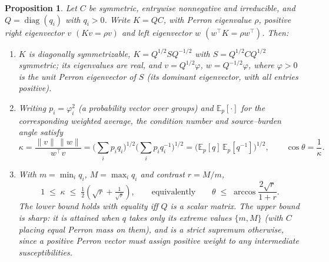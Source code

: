 \documentclass[10pt,a4paper]{amsart}
\newtheorem{proposition}{Proposition}
\begin{document}
\begin{proposition}\label{prop:kant}
Let $C$ be symmetric, entrywise nonnegative and irreducible, and $Q=\operatorname{diag}(q_i)$ with $q_i>0$. Write $K=QC$, with Perron eigenvalue $\rho$, positive right eigenvector $v$ $(Kv=\rho v)$ and left eigenvector $w$ $(w^{\top}K=\rho w^{\top})$. Then:
\begin{enumerate}
\item[\textup{(i)}] $K$ is diagonally symmetrizable, $K=Q^{1/2}SQ^{-1/2}$ with $S=Q^{1/2}CQ^{1/2}$ symmetric; its eigenvalues are real, and $v=Q^{1/2}\varphi$, $w=Q^{-1/2}\varphi$, where $\varphi>0$ is the unit Perron eigenvector of $S$ (its dominant eigenvector, with all entries positive).
\item[\textup{(ii)}] Writing $p_i=\varphi_i^{2}$ \textup{(}a probability vector over groups\textup{)} and $\mathbb{E}_p[\cdot]$ for the corresponding weighted average, the condition number and source--burden angle satisfy
\begin{equation}
\kappa=\frac{\lVert v\rVert\,\lVert w\rVert}{w^{\top}v}
=\Big(\textstyle\sum_i p_i q_i\Big)^{1/2}\Big(\sum_i p_i q_i^{-1}\Big)^{1/2}
=\big(\mathbb{E}_p[q]\,\mathbb{E}_p[q^{-1}]\big)^{1/2},
\qquad \cos\theta=\frac1\kappa .
\end{equation}
\item[\textup{(iii)}] With $m=\min_i q_i$, $M=\max_i q_i$ and contrast $r=M/m$,
\begin{equation}
1\;\le\;\kappa\;\le\;\tfrac12\!\left(\sqrt{r}+\tfrac{1}{\sqrt{r}}\right),
\qquad\text{equivalently}\qquad
\theta\;\le\;\arccos\frac{2\sqrt{r}}{1+r}.
\end{equation}
The lower bound holds with equality iff $Q$ is a scalar matrix. The upper bound is sharp: it is attained when $q$ takes only its extreme values $\{m,M\}$ (with $C$ placing equal Perron mass on them), and is a strict supremum otherwise, since a positive Perron vector must assign positive weight to any intermediate susceptibilities.
\end{enumerate}
\end{proposition}
\end{document}
